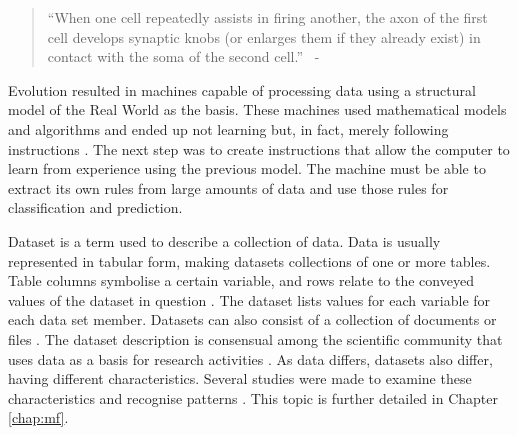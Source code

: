 \begin{quote}
  ``When one cell repeatedly assists in firing another, the axon of the first cell develops synaptic knobs (or enlarges them if they already exist) in contact with the soma of the second cell.''~ - \cite{hebb1949organisation} 
\end{quote}

Evolution resulted in machines capable of processing data using a structural model of the Real World as the basis. These machines used mathematical models and algorithms and ended up not learning but, in fact, merely following instructions \citep{cohen2021evolution}. The next step was to create instructions that allow the computer to learn from experience using the previous model. The machine must be able to extract its own rules from large amounts of data and use those rules for classification and prediction.

Dataset is a term used to describe a collection of data. Data is usually represented in tabular form, making datasets collections of one or more tables. Table columns symbolise a certain variable, and rows relate to the conveyed values of the dataset in question \citep{priyanka2016analysis}. The dataset lists values for each variable for each data set member. Datasets can also consist of a collection of documents or files \citep{snijders2012big}. The dataset description is consensual among the scientific community that uses data as a basis for research activities \citep{renear2010definitions}. As data differs, datasets also differ, having different characteristics. Several studies were made to examine these characteristics and recognise patterns \citep{reif2014automatic}. This topic is further detailed in Chapter \ref{chap:mf}.

